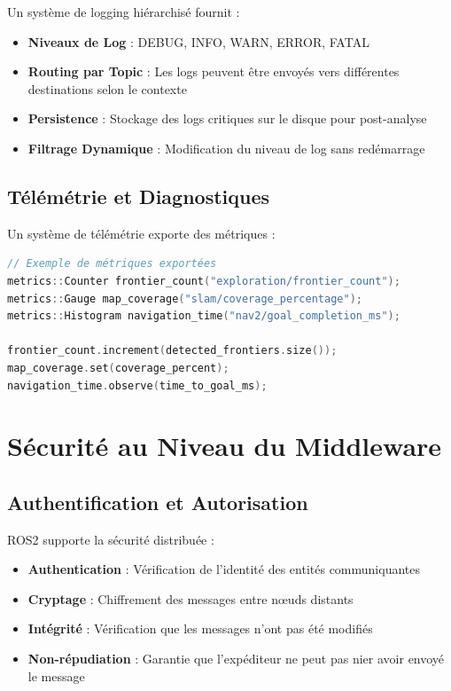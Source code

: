 \documentclass[12pt,a4paper,oneside]{report}
\begin{document}
Un système de logging hiérarchisé fournit :

\begin{itemize}
  \item \textbf{Niveaux de Log} : DEBUG, INFO, WARN, ERROR, FATAL
  \item \textbf{Routing par Topic} : Les logs peuvent être envoyés vers différentes destinations selon le contexte
  \item \textbf{Persistence} : Stockage des logs critiques sur le disque pour post-analyse
  \item \textbf{Filtrage Dynamique} : Modification du niveau de log sans redémarrage
\end{itemize}

\subsection{Télémétrie et Diagnostiques}

Un système de télémétrie exporte des métriques :

\begin{lstlisting}[language=C++]
// Exemple de métriques exportées
metrics::Counter frontier_count("exploration/frontier_count");
metrics::Gauge map_coverage("slam/coverage_percentage");
metrics::Histogram navigation_time("nav2/goal_completion_ms");

frontier_count.increment(detected_frontiers.size());
map_coverage.set(coverage_percent);
navigation_time.observe(time_to_goal_ms);
\end{lstlisting}

\section{Sécurité au Niveau du Middleware}

\subsection{Authentification et Autorisation}

ROS2 supporte la sécurité distribuée :

\begin{itemize}
  \item \textbf{Authentication} : Vérification de l'identité des entités communiquantes
  \item \textbf{Cryptage} : Chiffrement des messages entre nœuds distants
  \item \textbf{Intégrité} : Vérification que les messages n'ont pas été modifiés
  \item \textbf{Non-répudiation} : Garantie que l'expéditeur ne peut pas nier avoir envoyé le message
\end{itemize}
\end{document}
